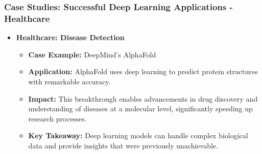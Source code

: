 \documentclass[aspectratio=169]{beamer}
\begin{document}
\begin{frame}[fragile]
    \frametitle{Case Studies: Successful Deep Learning Applications - Healthcare}
    \begin{itemize}
        \item \textbf{Healthcare: Disease Detection}
        \begin{itemize}
            \item \textbf{Case Example:} DeepMind's AlphaFold
            \item \textbf{Application:} 
            AlphaFold uses deep learning to predict protein structures with remarkable accuracy.
            \item \textbf{Impact:} 
            This breakthrough enables advancements in drug discovery and understanding of diseases at a molecular level, significantly speeding up research processes.
            \item \textbf{Key Takeaway:} 
            Deep learning models can handle complex biological data and provide insights that were previously unachievable.
        \end{itemize}
    \end{itemize}
\end{frame}
\end{document}
